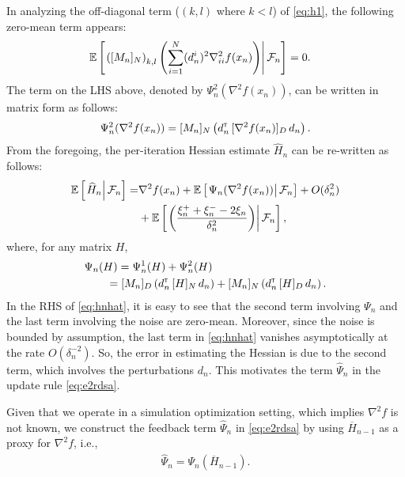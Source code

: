 \documentclass[letterpaper, 10 pt, conference]{ieeeconf}  %
\begin{document}
In analyzing the off-diagonal term ($(k,l)$ where $k < l$) of \eqref{eq:h1}, the following zero-mean term appears:
\begin{align}
& \mathbb{E}\left[\left.\left([M_n]_{N}\right)_{k,l}   \left(\sum\limits_{i=1}^N (d_n^i)^2 \nabla^2_{ii} f(x_n)\right)\right| \mathcal{F}_n \right] = 0. 
\end{align}
The term on the LHS above, denoted by $\Psi_{n}^{2}(\nabla^2 f(x_n))$, can be written in matrix form as follows: 
\begin{align}\label{eq:ndmat}
\Psi_{n}^{2}(\nabla^2 f(x_n)) = [M_n]_{N}\left(d_{n}^\mathsf{\scriptscriptstyle T} \, [\nabla^2 f(x_n)]_{D} \, d_{n}\right).
\end{align}
From the foregoing, the per-iteration Hessian estimate $\widehat H_n$ can be re-written as follows:
\begin{align}
 \mathbb{E}\left[\left.\widehat H_n\right| \mathcal{F}_n\right] = & \nabla^2 f(x_n) + \mathbb{E}\left[\left.\Psi_{n}(\nabla^2 f(x_n))\right| \mathcal{F}_n\right]  +  O(\delta_n^2)\nonumber\\
&+\mathbb{E}\left[\left.\left(\dfrac{\xi_n^+ + \xi_n^- - 2 \xi_n}{\delta_n^2} \right)\right| \mathcal{F}_n\right], \label{eq:hnhat}
\end{align}
where, for any matrix $H$, 
\begin{align}
&\Psi_{n}(H) = \Psi_{n}^{1}(H) + \Psi_{n}^{2}(H)\nonumber\\
&\qquad= [M_n]_{D}\left(d_{n}^\mathsf{\scriptscriptstyle T} \, [H]_{N} \, d_{n}\right) +  [M_n]_{N}\left(d_{n}^\mathsf{\scriptscriptstyle T} \, [H]_{D} \, d_{n}\right).\label{eq:psi}
\end{align}
In the RHS of \eqref{eq:hnhat}, it is easy to see that  the second term involving $\Psi_{n}$ and the last term involving the noise are zero-mean. Moreover, since the noise is bounded by assumption, the last term in \eqref{eq:hnhat} vanishes asymptotically at the rate $O(\delta_n^{-2})$. So, the error in estimating the Hessian is due to the second term, which involves the perturbations $d_n$. This motivates the term $\widehat \Psi_n$ in the update rule \eqref{eq:e2rdsa}. 


Given that we operate in a simulation optimization setting, which implies $\nabla^2 f$ is not known, we construct the feedback term $\widehat \Psi_n$ in \eqref{eq:e2rdsa} by using $\overline H_{n-1}$ as a proxy for $\nabla^2 f$, i.e.,
\begin{align}
\widehat \Psi_n = \Psi_{n} (\overline H_{n-1}).
\end{align}
\end{document}
